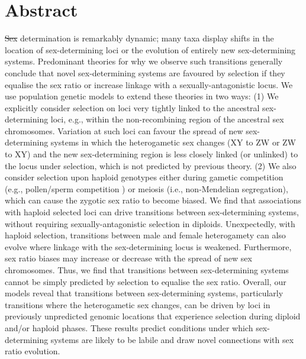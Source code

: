 \documentclass[10pt,letterpaper]{article}
\providecommand{\DIFadd}[1]{{\protect\color{blue}\uwave{#1}}} %
\providecommand{\DIFdel}[1]{{\protect\color{red}\sout{#1}}}                      %
\providecommand{\DIFaddbegin}{} %
\providecommand{\DIFaddend}{} %
\providecommand{\DIFdelbegin}{} %
\providecommand{\DIFdelend}{} %
\begin{document}
\section*{Abstract}
\DIFdelbegin \DIFdel{Sex }\DIFdelend \DIFaddbegin \DIFadd{Genetic sex }\DIFaddend determination is remarkably dynamic; many taxa display shifts in the location of sex-determining loci or the evolution of entirely new sex-determining systems. 
Predominant theories for why we observe such transitions generally conclude that novel sex-determining systems are favoured by selection if they equalise the sex ratio or increase linkage with a sexually-antagonistic locus. 
We use population genetic models to extend these theories in two ways: 
(1) We explicitly consider selection on loci very tightly linked to the ancestral sex-determining loci, e.g., within the non-recombining region of the ancestral sex chromosomes. 
Variation at such loci can favour the spread of new sex-determining systems in which the heterogametic sex changes (XY to ZW or ZW to XY) and the new sex-determining region is less closely linked (or unlinked) to the locus under selection, which is not predicted by previous theory. 
(2) We also consider selection upon haploid genotypes either during gametic competition (e.g., pollen/sperm competition \DIFaddbegin \DIFadd{involving multiple males}\DIFaddend ) or meiosis (i.e., non-Mendelian segregation), which can cause the zygotic sex ratio to become biased. 
We find that associations with haploid selected loci can drive transitions between sex-determining systems, without requiring sexually-antagonistic selection in diploids. 
Unexpectedly, with haploid selection, transitions between male and female heterogamety can also evolve where linkage with the sex-determining locus is weakened. 
Furthermore, sex ratio biases may increase or decrease with the spread of new sex chromosomes. 
Thus, we find that transitions between sex-determining systems cannot be simply predicted by selection to equalise the sex ratio. 
Overall, our models reveal that transitions between sex-determining systems, particularly transitions where the heterogametic sex changes, can be driven by loci in previously unpredicted genomic locations that experience selection during diploid and/or haploid phases.
These results predict conditions under which sex-determining systems are likely to be labile and draw novel connections with sex ratio evolution.


\end{document}
